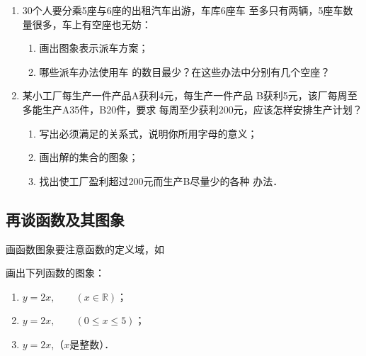 \begin{enumerate}
\item 
30个人要分乘5座与6座的出租汽车出游，车库6座车
至多只有两辆，5座车数量很多，车上有空座也无妨：
\begin{enumerate}
    \item 画出图象表示派车方案；
    \item 哪些派车办法使用车
的数目最少？在这些办法中分别有几个空座？
\end{enumerate}

\item 某小工厂每生产一件产品A获利4元，每生产一件产品
B获利5元，该厂每周至多能生产A35件，B20件，要求
每周至少获利200元，应该怎样安排生产计划？
\begin{enumerate}
    \item 写出必须满足的关系式，说明你所用字母的意义；
    \item 画出解的集合的图象；
    \item 找出使工厂盈利超过200元而生产B尽量少的各种
办法．
\end{enumerate}
\end{enumerate}

\subsection{再谈函数及其图象}
画函数图象要注意函数的定义域，如

\begin{example}
    画出下列函数的图象：
    \begin{enumerate}
        \item $y=2x,\qquad (x\in\mathbb{R})$；
        \item $y=2x,\qquad (0\le x\le 5)$；
        \item $y=2x$,\qquad （$x$是整数）．
    \end{enumerate}
\end{example}


